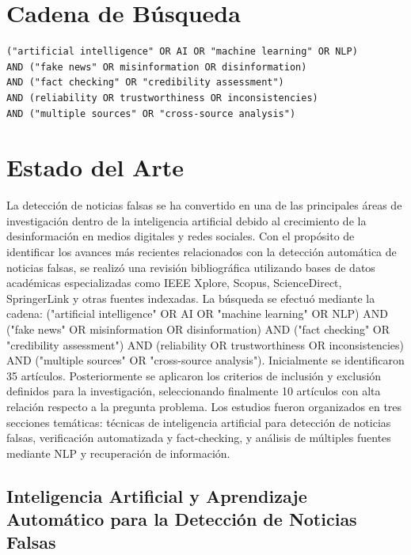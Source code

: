 \documentclass[12pt]{article}
\begin{document}
\section{Cadena de Búsqueda}

\begin{verbatim}
("artificial intelligence" OR AI OR "machine learning" OR NLP)
AND ("fake news" OR misinformation OR disinformation)
AND ("fact checking" OR "credibility assessment")
AND (reliability OR trustworthiness OR inconsistencies)
AND ("multiple sources" OR "cross-source analysis")
\end{verbatim}

\section{Estado del Arte}

La detección de noticias falsas se ha convertido en una de las principales áreas de investigación dentro de la inteligencia artificial debido al crecimiento de la desinformación en medios digitales y redes sociales. Con el propósito de identificar los avances más recientes relacionados con la detección automática de noticias falsas, se realizó una revisión bibliográfica utilizando bases de datos académicas especializadas como IEEE Xplore, Scopus, ScienceDirect, SpringerLink y otras fuentes indexadas. La búsqueda se efectuó mediante la cadena: ("artificial intelligence" OR AI OR "machine learning" OR NLP) AND ("fake news" OR misinformation OR disinformation) AND ("fact checking" OR "credibility assessment") AND (reliability OR trustworthiness OR inconsistencies) AND ("multiple sources" OR "cross-source analysis"). Inicialmente se identificaron 35 artículos. Posteriormente se aplicaron los criterios de inclusión y exclusión definidos para la investigación, seleccionando finalmente 10 artículos con alta relación respecto a la pregunta problema. Los estudios fueron organizados en tres secciones temáticas: técnicas de inteligencia artificial para detección de noticias falsas, verificación automatizada y fact-checking, y análisis de múltiples fuentes mediante NLP y recuperación de información.

\subsection{Inteligencia Artificial y Aprendizaje Automático para la Detección de Noticias Falsas}
\end{document}

